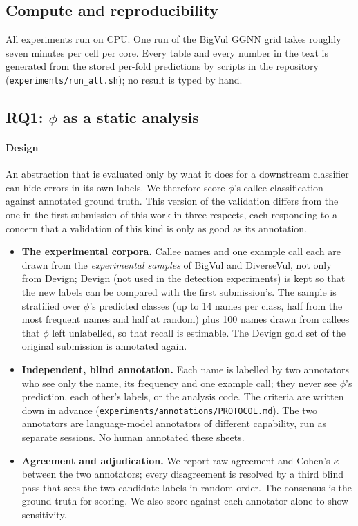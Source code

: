 \documentclass[pdflatex,sn-basic]{sn-jnl}
\theoremstyle{thmstyleone}%
\begin{document}
\subsection{Compute and reproducibility}
All experiments run on CPU. One run of the BigVul GGNN grid takes roughly
seven minutes per cell per core. Every table and every number in the text is
generated from the stored per-fold predictions by scripts in the repository
(\texttt{experiments/run\_all.sh}); no result is typed by hand.


\subsection{RQ1: $\phi$ as a static analysis}
\label{sec:rq_analysis}

\paragraph{Design} An abstraction that is evaluated only by what it does for a
downstream classifier can hide errors in its own labels. We therefore score
$\phi$'s callee classification against annotated ground truth. This version of
the validation differs from the one in the first submission of this work in
three respects, each responding to a concern that a validation of this kind is
only as good as its annotation.

\begin{itemize}
    \item \textbf{The experimental corpora.} Callee names and one
          example call each are drawn from the \emph{experimental samples} of
          BigVul and DiverseVul, not only from Devign; Devign (not used in the
          detection experiments) is kept so that the new labels can be compared
          with the first submission's. The sample is stratified
          over $\phi$'s predicted classes (up to 14 names per class, half from
          the most frequent names and half at random) plus 100 names drawn
          from callees that $\phi$ left unlabelled, so that recall is
          estimable. The Devign gold set of the original submission is
          annotated again.
    \item \textbf{Independent, blind annotation.} Each name is labelled by two
          annotators who see only the name, its frequency and one example call;
          they never see $\phi$'s prediction, each other's labels, or the
          analysis code. The criteria are written down in advance
          (\texttt{experiments/annotations/PROTOCOL.md}). The two annotators
          are language-model annotators of different capability, run as
          separate sessions. No human annotated these sheets.
    \item \textbf{Agreement and adjudication.} We report raw agreement and
          Cohen's $\kappa$~\citep{cohen1960coefficient} between the two annotators; every disagreement is
          resolved by a third blind pass that sees the two candidate labels in
          random order. The consensus is the ground truth for scoring. We also
          score against each annotator alone to show sensitivity.
\end{itemize}
\end{document}
